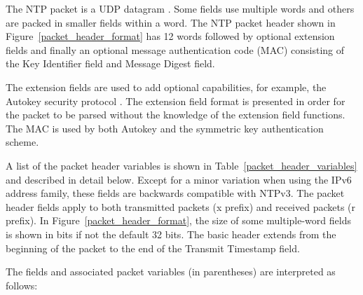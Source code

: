 The NTP packet is a UDP datagram \cite{RFC0768}. Some fields use multiple
words and others are packed in smaller fields within a word. The NTP
packet header shown in Figure~\ref{packet_header_format} has 12 words followed by optional
extension fields and finally an optional message authentication code
(MAC) consisting of the Key Identifier field and Message Digest
field.


The extension fields are used to add optional capabilities, for
example, the Autokey security protocol \cite{RFC5906}. The extension
field format is presented in order for the packet to be parsed
without the knowledge of the extension field functions. The MAC is
used by both Autokey and the symmetric key authentication scheme.

A list of the packet header variables is shown in Table~\ref{packet_header_variables} and
described in detail below. Except for a minor variation when using
the IPv6 address family, these fields are backwards compatible with
NTPv3. The packet header fields apply to both transmitted packets (x
prefix) and received packets (r prefix). In Figure~\ref{packet_header_format}, the size of
some multiple-word fields is shown in bits if not the default 32
bits. The basic header extends from the beginning of the packet to
the end of the Transmit Timestamp field.

The fields and associated packet variables (in parentheses) are
interpreted as follows:

